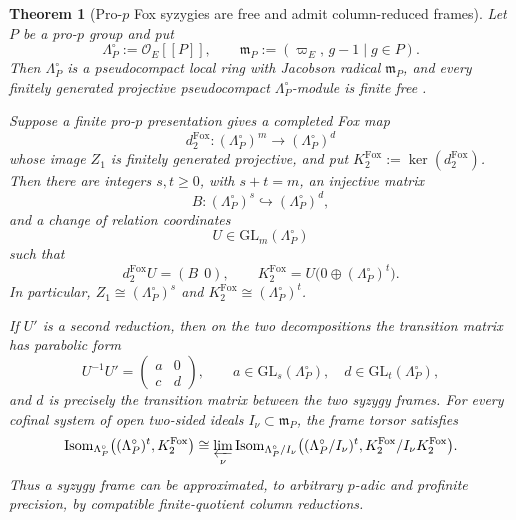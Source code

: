 \documentclass[11pt]{article}
\newtheorem{theorem}{Theorem}[section]
\theoremstyle{definition}
\begin{document}
\begin{theorem}[Pro-$p$ Fox syzygies are free and admit column-reduced frames]\label{thm:pro-p-fox-syzygy-free}
Let $P$ be a pro-$p$ group and put
\[
 \Lambda_P^{\circ}:=\mathcal O_E[[P]],
 \qquad
 \mathfrak m_P:=(\varpi_E,\,g-1\mid g\in P).
\]
Then $\Lambda_P^{\circ}$ is a pseudocompact local ring with Jacobson
radical $\mathfrak m_P$, and every finitely generated projective
pseudocompact $\Lambda_P^{\circ}$-module is finite free
\cite{Brumer}.

Suppose a finite pro-$p$ presentation gives a completed Fox map
\[
 d_2^{\mathrm{Fox}}:(\Lambda_P^{\circ})^m
 \longrightarrow(\Lambda_P^{\circ})^d
\]
whose image $Z_1$ is finitely generated projective, and put
$K_2^{\mathrm{Fox}}:=\ker(d_2^{\mathrm{Fox}})$.  Then there are integers
$s,t\ge0$, with $s+t=m$, an injective matrix
\[
 B:(\Lambda_P^{\circ})^s\hookrightarrow(\Lambda_P^{\circ})^d,
\]
and a change of relation coordinates
\[
 U\in\mathrm{GL}_m(\Lambda_P^{\circ})
\]
such that
\begin{equation}\label{eq:pro-p-column-reduction}
 d_2^{\mathrm{Fox}}U=(B\ \ 0),
 \qquad
 K_2^{\mathrm{Fox}}
 =U\bigl(0\oplus(\Lambda_P^{\circ})^t\bigr).
\end{equation}
In particular, $Z_1\cong(\Lambda_P^{\circ})^s$ and
$K_2^{\mathrm{Fox}}\cong(\Lambda_P^{\circ})^t$.

If $U'$ is a second reduction, then on the two decompositions the
transition matrix has parabolic form
\begin{equation}\label{eq:pro-p-frame-transition}
 U^{-1}U'
 =
 \begin{pmatrix}
  a&0\\ c&d
 \end{pmatrix},
 \qquad
 a\in\mathrm{GL}_s(\Lambda_P^{\circ}),
 \quad
 d\in\mathrm{GL}_t(\Lambda_P^{\circ}),
\end{equation}
and $d$ is precisely the transition matrix between the two syzygy
frames.  For every cofinal system of open two-sided ideals
$I_\nu\subset\mathfrak m_P$, the frame torsor satisfies
\begin{equation}\label{eq:pro-p-frame-limit}
 \operatorname{Isom}_{\Lambda_P^{\circ}}
 \bigl((\Lambda_P^{\circ})^t,K_2^{\mathrm{Fox}}\bigr)
 \cong
 \varprojlim_{\nu}
 \operatorname{Isom}_{\Lambda_P^{\circ}/I_\nu}
 \bigl((\Lambda_P^{\circ}/I_\nu)^t,
       K_2^{\mathrm{Fox}}/I_\nu K_2^{\mathrm{Fox}}\bigr).
\end{equation}
Thus a syzygy frame can be approximated, to arbitrary $p$-adic and
profinite precision, by compatible finite-quotient column reductions.
\end{theorem}
\end{document}
